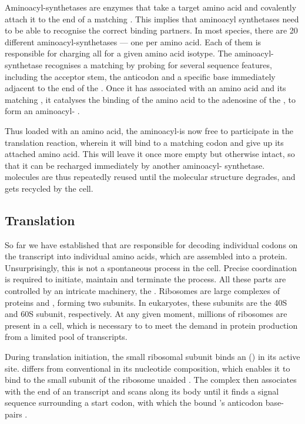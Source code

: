 Aminoacyl-\trna synthetases are enzymes that take a target amino acid and
covalently attach it to the \threep end of a matching \trna. This implies that
aminoacyl synthetases need to be able to recognise the correct binding partners.
In most species, there are \num{20} different aminoacyl-\trna synthetases ---
one per amino acid. Each of them is responsible for charging all \trna[s] for a
given amino acid isotype. The aminoacyl-\trna synthetase recognises a matching
\trna by probing for several sequence features, including the acceptor stem, the
anticodon and a specific base immediately adjacent to the \threep end of the
\trna. Once it has associated with an amino acid and its matching \trna, it
catalyses the binding of the amino acid to the \threep adenosine of the \trna,
to form an aminoacyl-\trna
\citep{Schimmel:1979,Schimmel:1993,Ibba:2000,Alberts:2002}.

Thus loaded with an amino acid, the aminoacyl-\trna is now free to participate
in the translation reaction, wherein it will bind to a matching codon and give
up its attached amino acid. This will leave it once more empty but otherwise
intact, so that it can be recharged immediately by another aminoacyl-\trna
synthetase. \trna molecules are thus repeatedly reused until the molecular
structure degrades, and gets recycled by the cell.

\subsection{Translation}

So far we have established that \trna[s] are responsible for decoding individual
codons on the \mrna transcript into individual amino acids, which are assembled
into a protein. Unsurprisingly, this is not a spontaneous process in the cell.
Precise coordination is required to initiate, maintain and terminate the
process. All these parts are controlled by an intricate machinery, the
. Ribosomes are large complexes of proteins and \rrna, forming
two subunits. In eukaryotes, these subunits are the 40S and 60S subunit,
respectively. At any given moment, millions of ribosomes are present in a cell,
which is necessary to to meet the demand in protein production from a limited
pool of \mrna transcripts.

During translation initiation, the small ribosomal subunit binds an
 () in its active site.
 differs from conventional  in its nucleotide
composition, which enables it to bind to the small subunit of the ribosome
unaided \citep{Kolitz:2010}. The complex then associates with the \fivep end of
an \mrna transcript and scans along its body until it finds a signal sequence
surrounding a start codon, with which the bound ’s anticodon
base-pairs \citep{Kozak:2002}.

